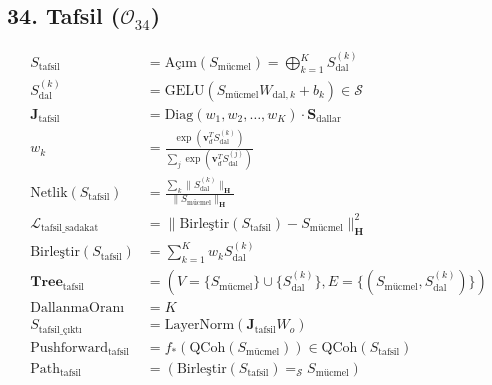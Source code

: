 \documentclass[11pt, a4paper]{article}
\begin{document}
\subsection{34. Tafsil ($\mathcal{O}_{34}$)}
\begin{align}
S_{\text{tafsil}} &= \text{Açım}(S_{\text{mücmel}}) = \bigoplus_{k=1}^K S_{\text{dal}}^{(k)} \\
S_{\text{dal}}^{(k)} &= \text{GELU}(S_{\text{mücmel}} W_{\text{dal}, k} + b_k) \in \mathcal{S} \\
\mathbf{J}_{\text{tafsil}} &= \text{Diag}(w_1, w_2, \dots, w_K) \cdot \mathbf{S}_{\text{dallar}} \\
w_k &= \frac{\exp(\mathbf{v}_d^T S_{\text{dal}}^{(k)})}{\sum_j \exp(\mathbf{v}_d^T S_{\text{dal}}^{(j)})} \\
\text{Netlik}(S_{\text{tafsil}}) &= \frac{\sum_k \|S_{\text{dal}}^{(k)}\|_{\mathbf{H}}}{\|S_{\text{mücmel}}\|_{\mathbf{H}}} \\
\mathcal{L}_{\text{tafsil\_sadakat}} &= \| \text{Birleştir}(S_{\text{tafsil}}) - S_{\text{mücmel}} \|_{\mathbf{H}}^2 \\
\text{Birleştir}(S_{\text{tafsil}}) &= \sum_{k=1}^K w_k S_{\text{dal}}^{(k)} \\
\mathbf{Tree}_{\text{tafsil}} &= \left( V=\{S_{\text{mücmel}}\} \cup \{S_{\text{dal}}^{(k)}\}, E=\{(S_{\text{mücmel}}, S_{\text{dal}}^{(k)})\}\right) \\
\text{DallanmaOranı} &= K \\
S_{\text{tafsil\_çıktı}} &= \text{LayerNorm}(\mathbf{J}_{\text{tafsil}} W_o) \\
\text{Pushforward}_{\text{tafsil}} &= f_*(\text{QCoh}(S_{\text{mücmel}})) \in \text{QCoh}(S_{\text{tafsil}}) \\
\text{Path}_{\text{tafsil}} &= (\text{Birleştir}(S_{\text{tafsil}}) =_{\mathcal{S}} S_{\text{mücmel}})
\end{align}
\end{document}
